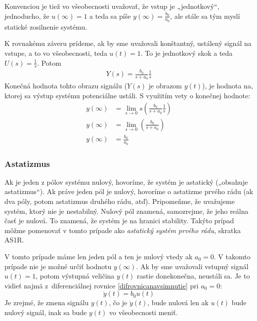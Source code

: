 \documentclass[a4paper, 10pt, ]{article}
\begin{document}
Konvenciou je tiež vo všeobecnosti uvažovať, že vstup je „jednotkový“, jednoducho, že $u(\infty) = 1$ a teda sa píše $y(\infty) = \frac{b_0 }{a_0}$, ale stále sa tým myslí statické zosilnenie systému.

K rovnakému záveru prídeme, ak by sme uvažovali konštantný, ustálený signál na vstupe, a to vo všeobecnosti, teda $u(t) = 1$. To je jednotkový skok a teda $U(s) = \frac{1}{s}$. Potom
\begin{align}
    Y(s) = \frac{b_0}{s + a_0} \frac{1}{s}
\end{align}
Konečná hodnota tohto obrazu signálu ($Y(s)$ je obrazom $y(t)$), je hodnota na, ktorej sa výstup systému potenciálne ustáli. S využitím vety o konečnej hodnote:
\begin{subequations}
    \begin{align}
        y(\infty) &= \lim_{s \to 0} s \left( \frac{b_0}{s + a_0} \frac{1}{s} \right) \\
        y(\infty) &= \lim_{s \to 0} \left( \frac{b_0}{s + a_0}  \right) \\
        y(\infty) &=  \frac{b_0}{a_0}
    \end{align}
\end{subequations}





\subsubsection{Astatizmus}

Ak je jeden z pólov systému nulový, hovoríme, že systém je astatický („obsahuje astatizmus“). Ak práve jeden pól je nulový, hovoríme o astatizme prvého rádu (ak dva póly, potom astatizmus druhého rádu, atď). Pripomeňme, že uvažujeme systém, ktorý nie je nestabilný. Nulový pól znamená, samozrejme, že jeho reálna časť je nulová. To znamená, že systém je na hranici stability. Takýto prípad môžme pomenovať v tomto prípade ako \emph{astatický systém prvého rádu}, skratka AS1R.

V tomto prípade máme len jeden pól a ten je nulový vtedy ak $a_0 = 0$. V takomto prípade nie je možné určiť hodnotu $y(\infty)$. Ak by sme uvažovali vstupný signál $u(t) = 1$, potom výstupná veličina $y(t)$ rastie donekonečna, neustáli sa. Je to vidieť najmä z~diferenciálnej rovnice \eqref{difrovnicanavsimnutie} pri $a_0 = 0$:
\begin{equation}
    \dot y(t) = b_0 u(t)
\end{equation}
Je zrejmé, že zmena signálu $y(t)$, čo je $\dot y(t)$, bude nulová len ak $u(t)$ bude nulový signál, inak sa bude $y(t)$ vo všeobecnosti meniť.
\end{document}
